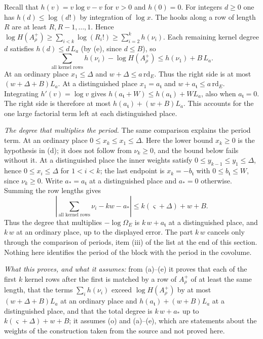 \documentclass[11pt,letterpaper]{article}
\begin{document}
Recall that $h(v)=v\log v-v$ for $v>0$ and $h(0)=0$. For integers $d\ge0$
one has $h(d)\le\log(d!)$ by integration of $\log x$.
The hooks along a row of length $R$ are at least $R,R-1,\ldots,1$.
Hence $\log H(A_\rho^+)\ge\sum_{i<k}\log(R_i!)\ge\sum_{i=2}^k h(\nu_i)$.
Each remaining kernel degree $d$ satisfies $h(d)\le d\,L_a$ (by (e), since $d\le B$), so
\begin{equation}\label{D:179}
           \sum_{\text{all kernel rows}}h(\nu_i)-\log H(A_\rho^+)
                 \le h(\nu_1)+B\,L_a .
\end{equation}
At an ordinary place $x_1\le\Delta$ and $w+\Delta\le a\,\mathrm{rd}_E$. Thus the right side
is at most $(w+\Delta+B)L_a$. At a distinguished place $x_1=a_{\mathfrak t}$ and
$w+a_{\mathfrak t}\le a\,\mathrm{rd}_E$. Integrating $h'(v)=\log v$ gives
$h(a_{\mathfrak t}+W)\le h(a_{\mathfrak t})+W L_a$, also when $a_{\mathfrak t}=0$. The right side is
therefore at most $h(a_{\mathfrak t})+(w+B)L_a$. This accounts for the one
large factorial term left at each distinguished place.

\emph{The degree that multiplies the period.} The same comparison explains the period term. At an
ordinary place $0\le x_k\le x_1\le\Delta$. Here the lower bound $x_k\ge0$ is the hypothesis in (d); it
does not follow from $\nu_k\ge0$, and the bound below fails without it. At a distinguished place the
inner weights satisfy $0\le y_{k-1}\le y_1\le\Delta$, hence $0\le x_i\le\Delta$ for
$1<i<k$; the last endpoint is $x_k=-b_{\mathfrak t}$ with
$0\le b_{\mathfrak t}\le W$, since $\nu_k\ge0$. Write $a_*=a_{\mathfrak t}$ at a
distinguished place and $a_*=0$ otherwise. Summing the row lengths gives
\begin{equation}\label{D:180}
  \left|\sum_{\text{all kernel rows}}\nu_i-kw-a_*\right|
      \le k(\varsigma+\Delta)+w+B .
\end{equation}
Thus the degree that multiplies $-\log\Omega_E$ is $k\,w+a_{\mathfrak t}$ at a distinguished place, and
$k\,w$ at an ordinary place, up to the displayed error. The part $k\,w$ cancels only through the comparison
of periods, item (iii) of the list at the end of this section. Nothing here identifies the period of the
block with the period in the covolume.

\emph{What this proves, and what it assumes:} from (a)--(e) it proves that each of the first $k$ kernel
rows after the first is matched by a row of $A_\rho^+$ of at least the same length, that the terms
$\sum_ih(\nu_i)$ exceed $\log H(A_\rho^+)$ by at most $(w+\Delta+B)L_a$ at an ordinary place and
$h(a_{\mathfrak t})+(w+B)L_a$ at a distinguished place, and that the total degree is $k\,w+a_*$ up to
$k(\varsigma+\Delta)+w+B$; it assumes (o) and (a)--(e), which are statements about the weights of the construction
taken from the source and not proved here.
\end{document}
